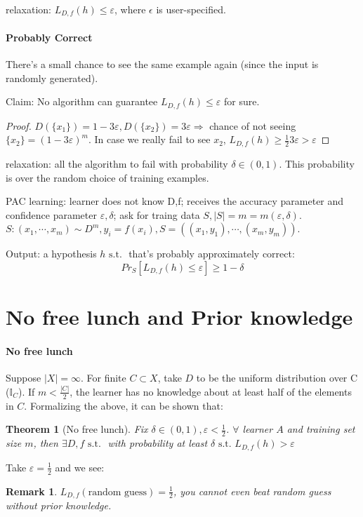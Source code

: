 \documentclass{book}
\newcommand{\st}{\text{ s.t. }}
\newtheorem{Thm}{Theorem}[section]
\newtheorem{Rmk}{Remark}[section]
\begin{document}
relaxation: $L_{D,f}(h)\leq \varepsilon$, where $\epsilon$ is user-specified.

\paragraph{Probably Correct}
There's a small chance to see the same example again (since the input is randomly generated).

Claim: No algorithm can guarantee $L_{D,f}(h)\leq\varepsilon$ for sure.
\begin{proof}
$D(\{x_{1}\})=1-3\varepsilon,D(\{x_{2}\})=3\varepsilon\Rightarrow$ chance of not seeing $\{x_{2}\}=(1-3\varepsilon)^{m}$. In case we really fail to see $x_{2}$, $L_{D,f}(h)\geq \frac{1}{2}3\varepsilon>\varepsilon$
\end{proof}

relaxation: all the algorithm to fail with probability $\delta\in(0,1)$. This probability is over the random choice of training examples.

PAC learning: learner does not know D,f; receives the accuracy parameter and confidence parameter $\varepsilon,\delta$; ask for traing data $S, |S|=m=m(\varepsilon,\delta)$. $S: (x_{1},\cdots, x_{m})\sim D^{m}, y_{i}=f(x_{i}), S=((x_{1},y_{1}),\cdots, (x_{m},y_{m}))$.

Output: a hypothesis $h \st$ that's probably approximately correct:
\[Pr_{S}[L_{D,f}(h)\leq \varepsilon]\geq 1-\delta\]

\section{No free lunch and Prior knowledge}

\paragraph{No free lunch} Suppose $|X|=\infty$. For finite $C\subset X$, take $D$ to be the uniform distribution over C ($\mathbb{I}_{C}$). If $m<\frac{|C|}{2}$, the learner has no knowledge about at least half of the elements in $C$. Formalizing the above, it can be shown that:
\begin{Thm}[No free lunch]
  Fix $\delta\in (0,1), \varepsilon<\frac{1}{2}$. $\forall$ learner $A$ and training set size $m$, then $\exists D,f\st$ with probability at least $\delta\st L_{D,f}(h)>\varepsilon$
\end{Thm}
Take $\varepsilon=\frac{1}{2}$ and we see:
\begin{Rmk}$L_{D,f}(\text{random guess})=\frac{1}{2}$, you cannot even beat random guess without prior knowledge.
\end{Rmk}
\end{document}

